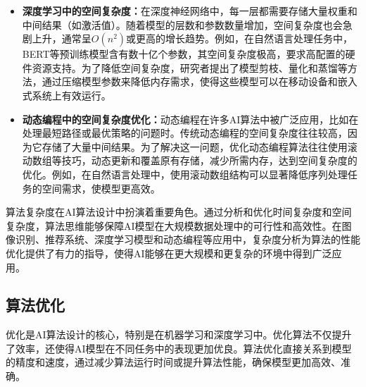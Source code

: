 \begin{enumerate}
\begin{itemize}
\item {\bf 深度学习中的空间复杂度：}在深度神经网络中，每一层都需要存储大量权重和中间结果（如激活值）。随着模型的层数和参数数量增加，空间复杂度也会急剧上升，通常呈$O(n^2)$或更高的增长趋势。例如，在自然语言处理任务中，BERT等预训练模型含有数十亿个参数，其空间复杂度极高，要求高配置的硬件资源支持。为了降低空间复杂度，研究者提出了模型剪枝、量化和蒸馏等方法，通过压缩模型参数来降低内存需求，使得这些模型可以在移动设备和嵌入式系统上有效运行。

\item {\bf 动态编程中的空间复杂度优化：}动态编程在许多AI算法中被广泛应用，比如在处理最短路径或最优策略的问题时。传统动态编程的空间复杂度往往较高，因为它存储了大量中间结果。为了解决这一问题，优化动态编程算法往往使用滚动数组等技巧，动态更新和覆盖原有存储，减少所需内存，达到空间复杂度的优化。例如，在自然语言处理中，使用滚动数组结构可以显著降低序列处理任务的空间需求，使模型更高效。
\end{itemize}
\end{enumerate}

算法复杂度在AI算法设计中扮演着重要角色。通过分析和优化时间复杂度和空间复杂度，算法思维能够保障AI模型在大规模数据处理中的可行性和高效性。在图像识别、推荐系统、深度学习模型和动态编程等应用中，复杂度分析为算法的性能优化提供了有力的指导，使得AI能够在更大规模和更复杂的环境中得到广泛应用。

\subsection{算法优化}
优化是AI算法设计的核心，特别是在机器学习和深度学习中。优化算法不仅提升了效率，还使得AI模型在不同任务中的表现更加优良。算法优化直接关系到模型的精度和速度，通过减少算法运行时间或提升算法性能，确保模型更加高效、准确。
 
